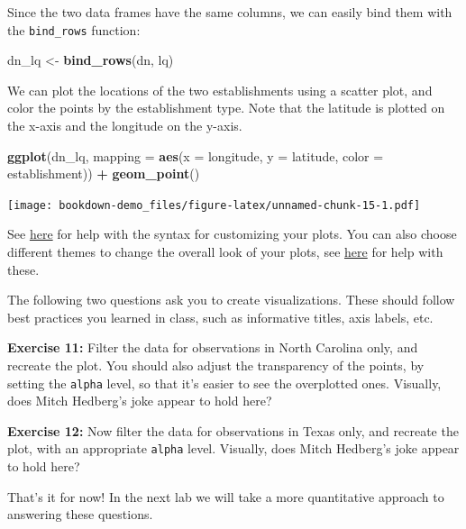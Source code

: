 \documentclass[]{book}
\newenvironment{Shaded}{\begin{snugshade}}{\end{snugshade}}
\newcommand{\KeywordTok}[1]{\textcolor[rgb]{0.13,0.29,0.53}{\textbf{#1}}}
\newcommand{\DataTypeTok}[1]{\textcolor[rgb]{0.13,0.29,0.53}{#1}}
\newcommand{\StringTok}[1]{\textcolor[rgb]{0.31,0.60,0.02}{#1}}
\newcommand{\OperatorTok}[1]{\textcolor[rgb]{0.81,0.36,0.00}{\textbf{#1}}}
\newcommand{\NormalTok}[1]{#1}
\theoremstyle{definition}
\theoremstyle{definition}
\theoremstyle{definition}
\theoremstyle{remark}
\begin{document}
Since the two data frames have the same columns, we can easily bind them
with the \texttt{bind\_rows} function:

\begin{Shaded}
\begin{Highlighting}[]
\NormalTok{dn_lq <-}\StringTok{ }\KeywordTok{bind_rows}\NormalTok{(dn, lq)}
\end{Highlighting}
\end{Shaded}

We can plot the locations of the two establishments using a scatter
plot, and color the points by the establishment type. Note that the
latitude is plotted on the x-axis and the longitude on the y-axis.

\begin{Shaded}
\begin{Highlighting}[]
\KeywordTok{ggplot}\NormalTok{(dn_lq, }\DataTypeTok{mapping =} \KeywordTok{aes}\NormalTok{(}\DataTypeTok{x =}\NormalTok{ longitude, }\DataTypeTok{y =}\NormalTok{ latitude, }\DataTypeTok{color =}\NormalTok{ establishment)) }\OperatorTok{+}
\StringTok{  }\KeywordTok{geom_point}\NormalTok{()}
\end{Highlighting}
\end{Shaded}

\texttt{[image: bookdown-demo\_files/figure-latex/unnamed-chunk-15-1.pdf]}

See \href{http://ggplot2.tidyverse.org/reference/labs.html}{here} for
help with the syntax for customizing your plots. You can also choose
different themes to change the overall look of your plots, see
\href{http://ggplot2.tidyverse.org/reference/ggtheme.html}{here} for
help with these.

The following two questions ask you to create visualizations. These
should follow best practices you learned in class, such as informative
titles, axis labels, etc.

\textbf{Exercise 11:} Filter the data for observations in North Carolina
only, and recreate the plot. You should also adjust the transparency of
the points, by setting the \texttt{alpha} level, so that it's easier to
see the overplotted ones. Visually, does Mitch Hedberg's joke appear to
hold here?

\textbf{Exercise 12:} Now filter the data for observations in Texas
only, and recreate the plot, with an appropriate \texttt{alpha} level.
Visually, does Mitch Hedberg's joke appear to hold here?

That's it for now! In the next lab we will take a more quantitative
approach to answering these questions.


\end{document}
